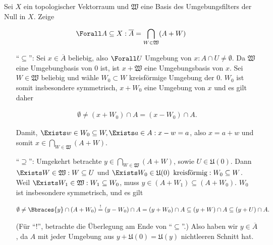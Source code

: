\begin{exercise}

Sei $X$ ein topologischer Vektorraum und $\mathfrak{W}$ eine Basis des Umgebungsfilters der Null in $X$.
Zeige

\begin{align*}
  \Forall A \subseteq X:
  \overline{A}
  =
  \bigcap_{W \in \mathfrak{W}} (A + W)
\end{align*}

\end{exercise}

\begin{solution}

\phantom{}

\begin{itemize}

  \item[\enquote{$\subseteq$}:]
  Sei $x \in \overline{A}$ beliebig, also $\Forall U$ Umgebung von $x: A \cap U \neq \emptyset$.
  Da $\mathfrak{W}$ eine Umgebungbasis von $0$ ist, ist $x + \mathfrak{W}$ eine Umgebungsbasis von $x$.
  Sei $W \in \mathfrak{W}$ beliebig und wähle $W_0 \subset W$ kreisförmige Umgebung der $0$.
  $W_0$ ist somit insbesondere symmetrisch, $x + W_0$ eine Umgebung von $x$ und es gilt daher

  \begin{align*}
    \emptyset
    \neq
    (x + W_0) \cap A
    =
    (x - W_0) \cap A.
  \end{align*}

  Damit, $\Exists w \in W_0 \subseteq W, \Exists a \in A: x - w = a$, also $x = a + w$ und somit $x \in \bigcap_{W \in \mathfrak{W}}(A + W)$.

  \item[\enquote{$\supseteq$}:]
  Umgekehrt betrachte $y \in \bigcap_{W \in \mathfrak{W}}(A + W)$, sowie $ U \in \mathfrak{U}(0)$.
  Dann $\Exists W \in \mathfrak{W}: W \subseteq U$ und $\Exists W_0 \in \mathfrak{U}(0) \enspace \text{kreisförmig}: W_0 \subseteq W$.
  Weil $\Exists W_1 \in \mathfrak{W}: W_1 \subseteq W_0$, muss $y \in (A + W_1) \subseteq (A + W_0)$.
  $W_0$ ist insbesondere symmetrisch, und es gilt

  \begin{align*}
    \emptyset
    \neq
    \Bbraces{y} \cap (A + W_0)
    \stackrel{!}{=}
    (y - W_0) \cap A = (y + W_0) \cap A
    \subseteq
    (y + W) \cap A
    \subseteq
    (y + U) \cap A.
  \end{align*}

  (Für \enquote{!}, betrachte die Überlegung am Ende von \enquote{$\subseteq$}.)
  Also haben wir $y \in \overline{A}$, da $A$ mit jeder Umgebung aus $y + \mathfrak{U}(0) = \mathfrak{U}(y)$ nichtleeren Schnitt hat.

\end{itemize}

\end{solution}
